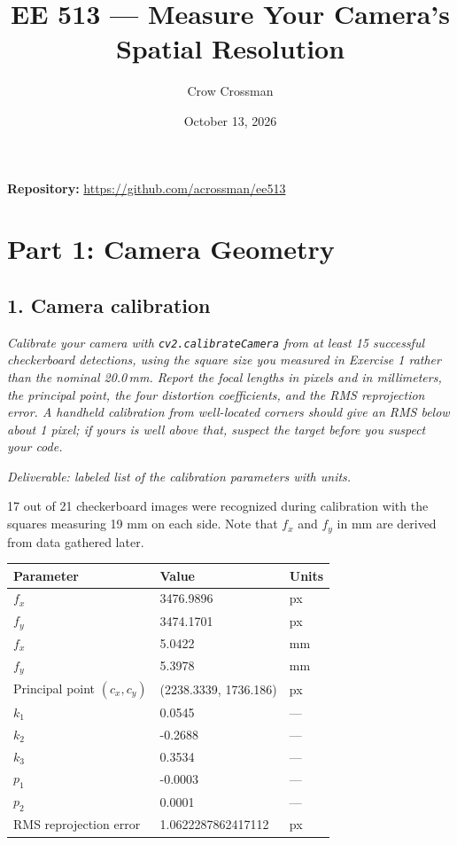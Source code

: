 \documentclass[11pt]{article}
\title{EE 513 --- Measure Your Camera's Spatial Resolution}
\author{Crow Crossman}
\date{October 13, 2026}
\newcommand{\task}[3]{\subsection*{#1}{\sloppy\noindent\textit{#2}\par}\smallskip\noindent\textit{Deliverable: #3}\par\medskip}
\begin{document}
\maketitle

\noindent\textbf{Repository:} \url{https://github.com/acrossman/ee513}

\section*{Part 1: Camera Geometry}

\task{1. Camera calibration}
{Calibrate your camera with \texttt{cv2.calibrateCamera} from at least 15 successful checkerboard detections, using the square size you measured in Exercise 1 rather than the nominal 20.0\,mm. Report the focal lengths in pixels and in millimeters, the principal point, the four distortion coefficients, and the RMS reprojection error. A handheld calibration from well-located corners should give an RMS below about 1 pixel; if yours is well above that, suspect the target before you suspect your code.}
{labeled list of the calibration parameters with units.}

17 out of 21 checkerboard images were recognized during calibration with the squares measuring 19 mm on each side. Note that $f_x$ and $f_y$ in mm are derived from data gathered later.

\begin{center}
\begin{tabular}{lll}
\toprule
Parameter & Value & Units \\
\midrule
$f_x$ & 3476.9896 & px \\
$f_y$ & 3474.1701 & px \\
$f_x$ & 5.0422 & mm \\ 
$f_y$ & 5.3978 & mm \\
Principal point $(c_x, c_y)$ & (2238.3339, 1736.186) & px \\
$k_1$ & 0.0545 & --- \\
$k_2$ & -0.2688 & --- \\
$k_3$ & 0.3534 & --- \\ 
$p_1$ & -0.0003 & --- \\
$p_2$ & 0.0001 & --- \\ 
RMS reprojection error & 1.0622287862417112 & px \\
\bottomrule
\end{tabular}
\end{center}
\end{document}
